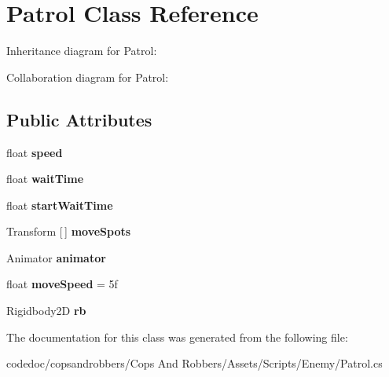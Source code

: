 \hypertarget{classPatrol}{}\section{Patrol Class Reference}
\label{classPatrol}


Inheritance diagram for Patrol\+:


Collaboration diagram for Patrol\+:
\subsection*{Public Attributes}
\begin{DoxyCompactItemize}
\item 
\mbox{\label{classPatrol_a8f9bce3c6e6d0b7e8c99a72c9ad05d6d}} 
float {\bfseries speed}
\item 
\mbox{\label{classPatrol_af625a87592c7bbe309d39952523b28b1}} 
float {\bfseries wait\+Time}
\item 
\mbox{\label{classPatrol_a5176e465d2237de39706fbde202db5d5}} 
float {\bfseries start\+Wait\+Time}
\item 
\mbox{\label{classPatrol_add0ec008d48d81b0d92d09e3102a47f3}} 
Transform \mbox{[}$\,$\mbox{]} {\bfseries move\+Spots}
\item 
\mbox{\label{classPatrol_ab490e66f74b7bc829b3deb8deb2efdaa}} 
Animator {\bfseries animator}
\item 
\mbox{\label{classPatrol_a7eb397fa71ae01a2964b75868634e57b}} 
float {\bfseries move\+Speed} = 5f
\item 
\mbox{\label{classPatrol_a3520c47f50f02f7fd31a86fb0b6da1ba}} 
Rigidbody2D {\bfseries rb}
\end{DoxyCompactItemize}


The documentation for this class was generated from the following file\+:\begin{DoxyCompactItemize}
\item 
codedoc/copsandrobbers/\+Cops And Robbers/\+Assets/\+Scripts/\+Enemy/Patrol.\+cs\end{DoxyCompactItemize}
